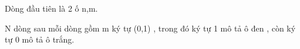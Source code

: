 Dòng đầu tiên là 2 ố n,m.

N dòng sau mỗi dòng gồm m ký tự (0,1) , trong đó ký tự 1 mô tả ô đen , còn ký tự 0 mô tả ô trắng.